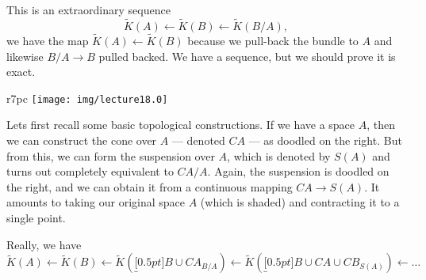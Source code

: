 This is an extraordinary sequence
\begin{equation}
\widetilde{K}(A)\gets\widetilde{K}(B)\gets\widetilde{K}(B/A),
\end{equation}
we have the map $\widetilde{K}(A)\gets\widetilde{K}(B)$ because
we pull-back the bundle to $A$ and likewise $B/A\to B$ pulled
backed.  We have a sequence, but we should prove it is exact.

\begin{wrapfigure}{r}{7pc}
  \texttt{[image: img/lecture18.0]}
\end{wrapfigure}
Lets first recall some basic topological constructions. If we
have a space $A$, then we can construct the cone over
$A$ ---
denoted $CA$ --- as doodled on the right. But from this, we can
form the suspension over $A$, which is denoted by $S(A)$ and
turns out completely equivalent to $CA/A$. Again, the
suspension
is doodled on the right, and we can obtain it from a continuous
mapping $CA\to S(A)$. It amounts to taking our original space $A$
(which is shaded) and contracting it to a single point.

Really, we have
\begin{equation}
\widetilde{K}(A)\gets
\widetilde{K}(B)\gets
\widetilde{K}(\underbracket[0.5pt]{B\cup CA}_{B/A})\gets
\widetilde{K}(\underbracket[0.5pt]{B\cup CA\cup CB}_{S(A)})\gets
\dots
\end{equation}

